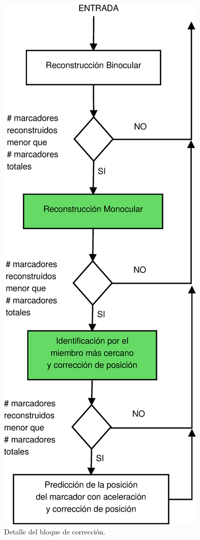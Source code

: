 \begin{figure}[H]
\begin{center}
\includegraphics[scale=0.25]{img/Sistema_completo/Diagrama_Detalle.eps}
\end{center}
\caption{Detalle del bloque de corrección.}
\label{fig:bloqCorr}
\end{figure}

